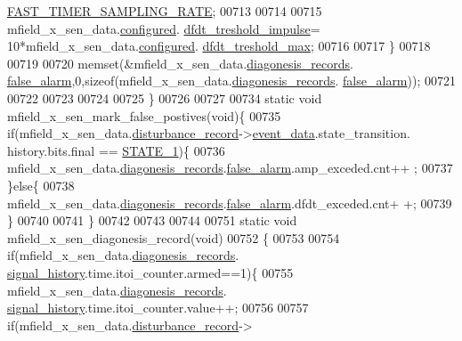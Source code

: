 \begin{DoxyCode}
      \hyperlink{a00021_a3a4dcb8af26a561d90607a41a3745806}{FAST\_TIMER\_SAMPLING\_RATE};
00713 
00714 
00715                      mfield\_x\_sen\_data.\hyperlink{a00025_a94b2d1f6ea4ab334c74d24984dd27843}{configured}.
      \hyperlink{a00021_a3b9c683370c94430a4c6a9d78ce6f5ef}{dfdt\_treshold\_impulse}= 10*mfield\_x\_sen\_data.\hyperlink{a00025_a94b2d1f6ea4ab334c74d24984dd27843}{configured}.
      \hyperlink{a00021_adf9a37828e447378b1d533185213316d}{dfdt\_treshold\_max};
00716 
00717                   \}
00718 
00719 
00720                    memset(&mfield\_x\_sen\_data.\hyperlink{a00025_a2bd79ce84bbd6b7f50d38954f7ae475e}{diagonesis\_records}.
      \hyperlink{a00019_a55109284fe950025b5d9f3dde60d4553}{false\_alarm},0,\textcolor{keyword}{sizeof}(mfield\_x\_sen\_data.\hyperlink{a00025_a2bd79ce84bbd6b7f50d38954f7ae475e}{diagonesis\_records}.
      \hyperlink{a00019_a55109284fe950025b5d9f3dde60d4553}{false\_alarm}));
00721 
00722 
00723 
00724 
00725 \}
00726 
00727 
00734  \textcolor{keyword}{static} \textcolor{keywordtype}{void} mfield\_x\_sen\_mark\_false\_postives(\textcolor{keywordtype}{void})\{
00735         \textcolor{keywordflow}{if}(mfield\_x\_sen\_data.\hyperlink{a00025_ac9b38e2c1d3f1013a88d33506c754152}{disturbance\_record}->\hyperlink{a00028_a8c0bda69e71ef674e60da47ad0be9ab0}{event\_data}.state\_transition.
      history.bits.final == \hyperlink{a00021_a727351838367f27ac0adb9a13422c342}{STATE\_1})\{
00736             mfield\_x\_sen\_data.\hyperlink{a00025_a2bd79ce84bbd6b7f50d38954f7ae475e}{diagonesis\_records}.\hyperlink{a00019_a55109284fe950025b5d9f3dde60d4553}{false\_alarm}.amp\_exceded.cnt++
      ;
00737         \}\textcolor{keywordflow}{else}\{
00738             mfield\_x\_sen\_data.\hyperlink{a00025_a2bd79ce84bbd6b7f50d38954f7ae475e}{diagonesis\_records}.\hyperlink{a00019_a55109284fe950025b5d9f3dde60d4553}{false\_alarm}.dfdt\_exceded.cnt+
      +;
00739        \}
00740 
00741 \}
00742 
00743 
00744 
00751  \textcolor{keyword}{static} \textcolor{keywordtype}{void} mfield\_x\_sen\_diagonesis\_record(\textcolor{keywordtype}{void})
00752  \{
00753 
00754               \textcolor{keywordflow}{if}(mfield\_x\_sen\_data.\hyperlink{a00025_a2bd79ce84bbd6b7f50d38954f7ae475e}{diagonesis\_records}.
      \hyperlink{a00019_ab7038f4de1f77b52a7f89e9f77c0b846}{signal\_history}.time.itoi\_counter.armed==1)\{
00755                mfield\_x\_sen\_data.\hyperlink{a00025_a2bd79ce84bbd6b7f50d38954f7ae475e}{diagonesis\_records}.
      \hyperlink{a00019_ab7038f4de1f77b52a7f89e9f77c0b846}{signal\_history}.time.itoi\_counter.value++;
00756 
00757                \textcolor{keywordflow}{if}(mfield\_x\_sen\_data.\hyperlink{a00025_ac9b38e2c1d3f1013a88d33506c754152}{disturbance\_record}->

\end{DoxyCode}
